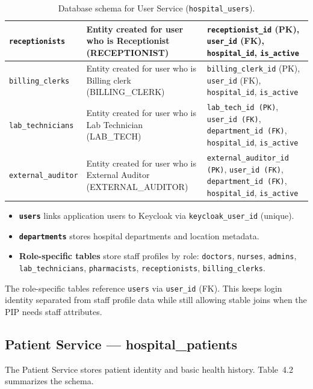 \begin{table}[H]
\begin{tabular}{|p{3.2cm}|p{5.6cm}|p{5.6cm}|}
    \hline
    \texttt{receptionists} &
    Entity created for user who is Receptionist (RECEPTIONIST) &
    \texttt{receptionist\_id} (PK), \texttt{user\_id} (FK), \texttt{hospital\_id}, \texttt{is\_active} \\
    \hline
    \texttt{billing\_clerks} &
    Entity created for user who is Billing clerk (BILLING\_CLERK) &
    \texttt{billing\_clerk\_id} (PK), \texttt{user\_id} (FK), \texttt{hospital\_id}, \texttt{is\_active} \\
    \hline
    \texttt{lab\_technicians}  & Entity created for user who is Lab Technician (LAB\_TECH) & \texttt{lab\_tech\_id (PK)}, \texttt{user\_id (FK)}, \texttt{department\_id (FK)}, \texttt{hospital\_id}, \texttt{is\_active}\\
    \hline
    \texttt{external\_auditor} & Entity created for user who is External Auditor (EXTERNAL\_AUDITOR) & \texttt{external\_auditor\_id (PK)}, \texttt{user\_id (FK)}, \texttt{department\_id (FK)}, \texttt{hospital\_id}, \texttt{is\_active}\\
    \hline
\hline
\end{tabular}
\label{tab:db-schema-user-service}
\caption{Database schema for User Service (\texttt{hospital\_users}).}
\end{table}
\begin{itemize}
  \item \textbf{\texttt{users}} links application users to Keycloak via \texttt{keycloak\_user\_id} (unique).
  \item \textbf{\texttt{departments}} stores hospital departments and location metadata.
  \item \textbf{Role-specific tables} store staff profiles by role:
  \texttt{doctors}, \texttt{nurses}, \texttt{admins}, \texttt{lab\_technicians},
  \texttt{pharmacists}, \texttt{receptionists}, \texttt{billing\_clerks}.
\end{itemize}
The role-specific tables reference \texttt{users} via \texttt{user\_id} (FK). This keeps login identity separated from staff profile data while still allowing stable joins when the PIP needs staff attributes.



\subsection{Patient Service — hospital\_patients}
The Patient Service stores patient identity and basic health history. Table~4.2 summarizes the schema.


